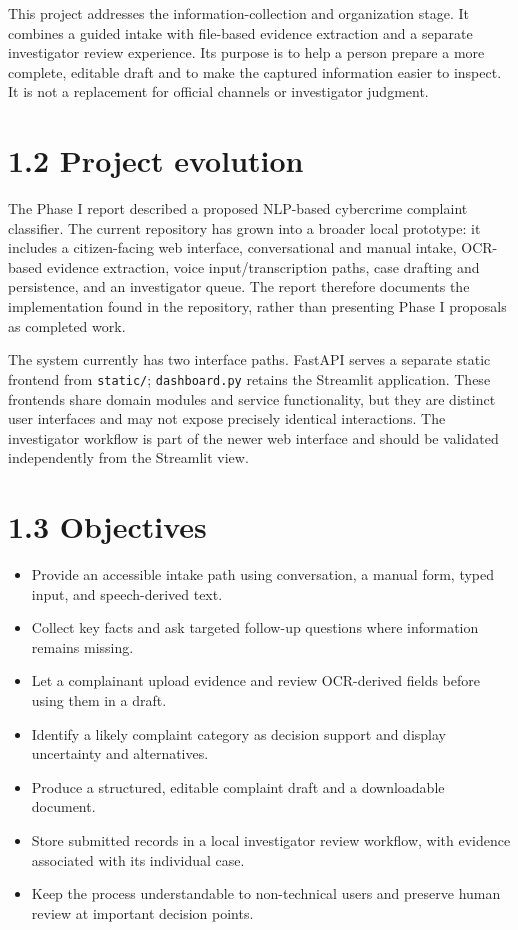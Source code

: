 \documentclass[12pt,a4paper,oneside]{report}
\begin{document}
This project addresses the information-collection and organization stage. It combines a guided intake with file-based evidence extraction and a separate investigator review experience. Its purpose is to help a person prepare a more complete, editable draft and to make the captured information easier to inspect. It is not a replacement for official channels or investigator judgment.

\section{1.2 Project evolution}
The Phase I report described a proposed NLP-based cybercrime complaint classifier. The current repository has grown into a broader local prototype: it includes a citizen-facing web interface, conversational and manual intake, OCR-based evidence extraction, voice input/transcription paths, case drafting and persistence, and an investigator queue. The report therefore documents the implementation found in the repository, rather than presenting Phase I proposals as completed work.

The system currently has two interface paths. FastAPI serves a separate static frontend from \texttt{static/}; \texttt{dashboard.py} retains the Streamlit application. These frontends share domain modules and service functionality, but they are distinct user interfaces and may not expose precisely identical interactions. The investigator workflow is part of the newer web interface and should be validated independently from the Streamlit view.

\section{1.3 Objectives}
\begin{itemize}
\item Provide an accessible intake path using conversation, a manual form, typed input, and speech-derived text.
\item Collect key facts and ask targeted follow-up questions where information remains missing.
\item Let a complainant upload evidence and review OCR-derived fields before using them in a draft.
\item Identify a likely complaint category as decision support and display uncertainty and alternatives.
\item Produce a structured, editable complaint draft and a downloadable document.
\item Store submitted records in a local investigator review workflow, with evidence associated with its individual case.
\item Keep the process understandable to non-technical users and preserve human review at important decision points.
\end{itemize}
\end{document}
